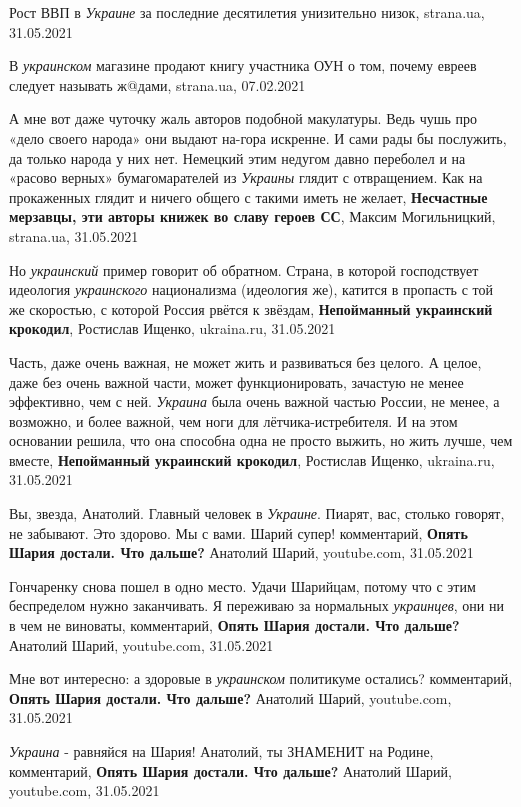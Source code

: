 Рост ВВП в \emph{Украине} за последние десятилетия унизительно низок,
strana.ua, 31.05.2021

В \emph{украинском} магазине продают книгу участника ОУН о том, почему евреев следует
называть ж@дами, strana.ua, 07.02.2021

А мне вот даже чуточку жаль авторов подобной макулатуры. Ведь чушь про «дело
своего народа» они выдают на-гора искренне. И сами рады бы послужить, да только
народа у них нет. Немецкий этим недугом давно переболел и на «расово верных»
бумагомарателей из \emph{Украины} глядит с отвращением. Как на прокаженных
глядит и ничего общего с такими иметь не желает, \textbf{Несчастные мерзавцы,
эти авторы книжек во славу героев СС}, Максим Могильницкий, strana.ua,
31.05.2021

Но \emph{украинский} пример говорит об обратном. Страна, в которой господствует
идеология \emph{украинского} национализма (идеология же), катится в пропасть с
той же скоростью, с которой Россия рвётся к звёздам, \textbf{Непойманный
украинский крокодил}, Ростислав Ищенко, ukraina.ru, 31.05.2021

Часть, даже очень важная, не может жить и развиваться без целого. А целое, даже
без очень важной части, может функционировать, зачастую не менее эффективно,
чем с ней. \emph{Украина} была очень важной частью России, не менее, а
возможно, и более важной, чем ноги для лётчика-истребителя. И на этом основании
решила, что она способна одна не просто выжить, но жить лучше, чем вместе,
\textbf{Непойманный украинский крокодил}, Ростислав Ищенко, ukraina.ru,
31.05.2021

Вы, звезда, Анатолий. Главный человек в \emph{Украине}. Пиарят, вас, столько говорят,
не забывают. Это здорово. Мы с вами. Шарий супер!
комментарий, \textbf{Опять Шария достали. Что дальше?} Анатолий Шарий, youtube.com, 31.05.2021

Гончаренку снова пошел в одно место. Удачи Шарийцам, потому что с этим
беспределом нужно заканчивать.  Я переживаю за нормальных \emph{украинцев}, они ни в
чем не виноваты,
комментарий, \textbf{Опять Шария достали. Что дальше?} Анатолий Шарий, youtube.com, 31.05.2021

Мне вот интересно: а здоровые в \emph{украинском} политикуме остались?
комментарий, \textbf{Опять Шария достали. Что дальше?} Анатолий Шарий, youtube.com, 31.05.2021

\emph{Украина} - равняйся на Шария! Анатолий, ты ЗНАМЕНИТ на Родине,
комментарий, \textbf{Опять Шария достали. Что дальше?} Анатолий Шарий, youtube.com, 31.05.2021

